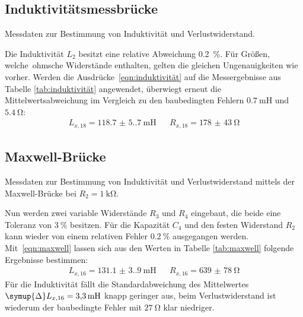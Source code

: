 \subsection{Induktivitätsmessbrücke}
\label{sec:4.3}

\begin{table}
	\centering
	\caption{Messdaten zur Bestimmung von Induktivität und Verlustwiderstand.}
	
	\label{tab:induktivität}
\end{table}

Die Induktivität $L_2$ besitzt eine relative Abweichung \qty{0.2}{\percent}. Für Größen, \mbox{welche ohmsche}
Widerstände enthalten, gelten die gleichen Ungenauigkeiten wie vorher. Werden die
Ausdrücke~\eqref{eqn:induktivität} auf die Messergebnisse aus Tabelle \ref{tab:induktivität} angewendet,
überwiegt erneut die Mittelwertsabweichung im Vergleich zu den baubedingten Fehlern $\qty{0.7}{\milli\henry}$
und $\qty{5.4}{\ohm}$:
\begin{align*}
	L_{x,18} = \qty{118.7(5.7)}{\milli\henry} && R_{x,18} = \qty{178(43)}{\ohm}
\end{align*}

\subsection{Maxwell-Brücke}
\label{sec:4.4}

\begin{table}
	\centering
	\caption{Messdaten zur Bestimmung von Induktivität und Verlustwiderstand mittels der
			 Maxwell-Brücke bei $R_2 = \qty{1}{\kilo\ohm}$.}
	
	\label{tab:maxwell}
\end{table}

Nun werden zwei variable Widerstände $R_3$ und $R_4$ eingebaut, die beide eine Toleranz von
$\qty{3}{\percent}$ besitzen. Für die Kapazität $C_4$ und den festen Widerstand $R_2$ kann wieder
von einem relativen Fehler $\qty{0.2}{\percent}$ ausgegangen werden. Mit~\eqref{eqn:maxwell} lassen
sich aus den Werten in Tabelle \ref{tab:maxwell} folgende Ergebnisse bestimmen:
\begin{align*}
	L_{x,16} = \qty{131.1(3.9)}{\milli\henry} && R_{x,16} = \qty{639(78)}{\ohm}
\end{align*}
Für die Induktivität fällt die Standardabweichung des Mittelwertes
$\symup{\Delta} L_{x,16} = \qty{3.3}{\milli\henry}$ knapp geringer aus, beim Verlustwiderstand ist wiederum
der baubedingte Fehler mit $\qty{27}{\ohm}$ klar niedriger.

